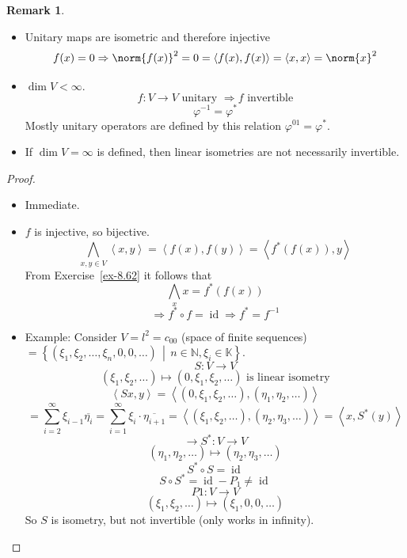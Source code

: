 \documentclass[a4paper,landscape,twocolumn]{article}
\newcommand\setdef[2]{\left\{#1\,\middle|\,#2\right\}}
\newcommand\functional[1]{\left\langle{#1}\right\rangle}
\theoremstyle{definition}
\newtheorem{rem}{Remark}
\DeclarePairedDelimiter\norm\lVert\rVert
\begin{document}
\begin{rem}
  \begin{itemize}
    \item Unitary maps are isometric and therefore injective
      \[
        f(x) = 0 \Rightarrow \norm{f(x)}^2 = 0
        = \functional{f(x), f(x)} = \functional{x,x} = \norm{x}^2
      \]
    \item $\dim{V} < \infty$.
      \[ f: V \to V \text{ unitary } \Rightarrow f \text{ invertible} \]
      \[ \varphi^{-1} = \varphi^* \]
      Mostly unitary operators are defined by this relation $\varphi^{01} = \varphi^*$.
    \item If $\dim{V} = \infty$ is defined, then linear isometries are not necessarily invertible.
  \end{itemize}
\end{rem}
\begin{proof}
  \begin{itemize}
    \item Immediate.
    \item $f$ is injective, so bijective.
      \[ \bigwedge_{x,y \in V} \functional{x,y} = \functional{f(x), f(y)} = \functional{f^*(f(x)),y} \]
      From Exercise~\ref{ex-8.62} it follows that
      \[ \bigwedge_{x} x = f^*(f(x)) \]
      \[ \Rightarrow f^* \circ f = \operatorname{id} \Rightarrow f^* = f^{-1} \]
    \item
      Example: Consider $V = l^2 = c_{00}$ (space of finite sequences) $= \setdef{(\xi_1, \xi_2, \ldots, \xi_n, 0, 0, \ldots)}{n \in \mathbb N, \xi_i \in \mathbb K}$.
      \[ S: V \to V \]
      \[ (\xi_1, \xi_2, \ldots) \mapsto (0, \xi_1, \xi_2, \ldots) \text{ is linear isometry} \]
      \[ \functional{Sx, y} = \functional{(0, \xi_1, \xi_2, \ldots), (\eta_1, \eta_2, \ldots)} \]
      \[
        = \sum_{i=2}^\infty \xi_{i-1} \overline{\eta_i}
        = \sum_{i=1}^\infty \xi_i \cdot \overline{\eta_{i+1}}
        = \functional{(\xi_1, \xi_2, \ldots), (\eta_2, \eta_3, \ldots)}
        = \functional{x, S^*(y)}
      \] \[
        \to S^*: V \to V
      \] \[
        (\eta_1, \eta_2, \ldots) \mapsto (\eta_2, \eta_3, \ldots)
      \] \[
        S^* \circ S = \operatorname{id}
      \] \[
        S \circ S^* = \operatorname{id} - P_1 \neq \operatorname{id}
      \] \[
        P1: V \to V
      \] \[
        (\xi_1, \xi_2, \ldots) \mapsto (\xi_1, 0, 0, \ldots)
      \]
      So $S$ is isometry, but not invertible (only works in infinity).
  \end{itemize}
\end{proof}
\end{document}
